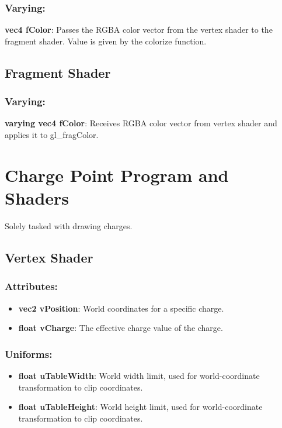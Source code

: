\documentclass[10pt]{report}
\begin{document}
\subsubsection{Varying:}

\textbf{vec4 fColor}: Passes the RGBA color vector from the vertex shader to the fragment shader. Value is given by the colorize function.

\subsection{Fragment Shader}
	
\subsubsection{Varying:}

\textbf{varying vec4 fColor}: Receives RGBA color vector from vertex shader and applies it to gl\_fragColor. 
	
\section{Charge Point Program and Shaders}

Solely tasked with drawing charges.

\subsection{Vertex Shader}

\subsubsection{Attributes:}

\begin{itemize}
    \item\textbf{vec2 vPosition}: World coordinates for a specific charge.
    \item \textbf{float vCharge}: The effective charge value of the charge.
\end{itemize}

\subsubsection{Uniforms:}

\begin{itemize}
    \item \textbf{float uTableWidth}: World width limit, used for world-coordinate transformation to clip coordinates.
    \item \textbf{float uTableHeight}: World height limit, used for world-coordinate transformation to clip coordinates.
\end{itemize} 
\end{document}
